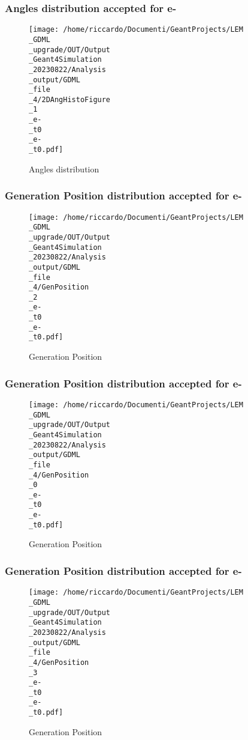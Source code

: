 \documentclass[8pt]{beamer}
\begin{document}
            \begin{frame}
                \frametitle{Angles distribution accepted for e-}
            
        \begin{figure}[h]
            \centering
            \texttt{[image: /home/riccardo/Documenti/GeantProjects/LEM\\\_GDML\\\_upgrade/OUT/Output\\\_Geant4Simulation\\\_20230822/Analysis\\\_output/GDML\\\_file\\\_4/2DAngHistoFigure\\\_1\\\_e-\\\_t0\\\_e-\\\_t0.pdf]}
            \caption{Angles distribution}
        \end{figure}
        
            \end{frame}
            
            \begin{frame}
                \frametitle{Generation Position distribution accepted for e-}
            
        \begin{figure}[h]
            \centering
            \texttt{[image: /home/riccardo/Documenti/GeantProjects/LEM\\\_GDML\\\_upgrade/OUT/Output\\\_Geant4Simulation\\\_20230822/Analysis\\\_output/GDML\\\_file\\\_4/GenPosition\\\_2\\\_e-\\\_t0\\\_e-\\\_t0.pdf]}
            \caption{Generation Position}
        \end{figure}
        
            \end{frame}
            
            \begin{frame}
                \frametitle{Generation Position distribution accepted for e-}
            
        \begin{figure}[h]
            \centering
            \texttt{[image: /home/riccardo/Documenti/GeantProjects/LEM\\\_GDML\\\_upgrade/OUT/Output\\\_Geant4Simulation\\\_20230822/Analysis\\\_output/GDML\\\_file\\\_4/GenPosition\\\_0\\\_e-\\\_t0\\\_e-\\\_t0.pdf]}
            \caption{Generation Position}
        \end{figure}
        
            \end{frame}
            
            \begin{frame}
                \frametitle{Generation Position distribution accepted for e-}
            
        \begin{figure}[h]
            \centering
            \texttt{[image: /home/riccardo/Documenti/GeantProjects/LEM\\\_GDML\\\_upgrade/OUT/Output\\\_Geant4Simulation\\\_20230822/Analysis\\\_output/GDML\\\_file\\\_4/GenPosition\\\_3\\\_e-\\\_t0\\\_e-\\\_t0.pdf]}
            \caption{Generation Position}
        \end{figure}
        
            \end{frame}
            
\end{document}
